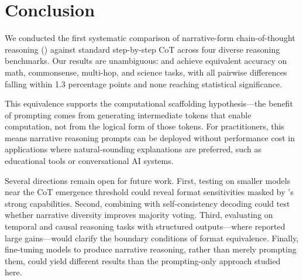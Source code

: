\section{Conclusion}
\label{sec:conclusion}

We conducted the first systematic comparison of narrative-form chain-of-thought reasoning (\storycot) against standard step-by-step CoT across four diverse reasoning benchmarks. Our results are unambiguous: \storycot and \fewshotcot achieve equivalent accuracy on math, commonsense, multi-hop, and science tasks, with all pairwise differences falling within 1.3 percentage points and none reaching statistical significance.

This equivalence supports the computational scaffolding hypothesis---the benefit of \chainofthought prompting comes from generating intermediate tokens that enable computation, not from the logical form of those tokens. For practitioners, this means narrative reasoning prompts can be deployed without performance cost in applications where natural-sounding explanations are preferred, such as educational tools or conversational AI systems.

Several directions remain open for future work. First, testing \storycot on smaller models near the CoT emergence threshold could reveal format sensitivities masked by \gptfour's strong capabilities. Second, combining \storycot with self-consistency decoding \citep{wang2023selfconsistency} could test whether narrative diversity improves majority voting. Third, evaluating on temporal and causal reasoning tasks with structured outputs---where \citet{zhang2024narrative} reported large gains---would clarify the boundary conditions of format equivalence. Finally, fine-tuning models to produce narrative reasoning, rather than merely prompting them, could yield different results than the prompting-only approach studied here.
